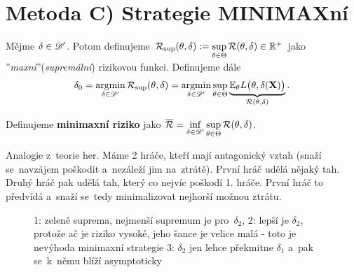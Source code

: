 \section{Metoda C) Strategie MINIMAXní}
\begin{define}
	Mějme $\delta\in\mathscr{D}'$. Potom definujeme $\mathcal{R}_{\sup}(\theta,\delta):=\sup\limits_{\theta\in\Theta} \mathcal{R}(\theta,\delta) \in\mathbb{R}^+$ jako ''\textit{maxní}''(\textit{supremální}) rizikovou funkci. Definujeme dále
	$$ \delta_0=\mathop{\mathrm{argmin}}\limits_{\delta\in\mathscr{D}'}\mathcal{R}_{\sup}(\theta,\delta)=\mathop{\mathrm{argmin}}\limits_{\delta\in\mathscr{D}' }\sup\limits_{\theta\in\Theta}\underbrace{\mathbb{E}_\theta L\big(\theta,\delta(\textbf{X})\big)}_{\mathcal{R}(\theta,\delta)}.$$
\end{define}

\begin{define}
	Definujeme \textbf{minimaxní riziko} jako $\overline{\mathcal{R}}=\inf\limits_{\delta\in\mathscr{D}'}\sup\limits_{\theta\in\Theta}\mathcal{R}(\theta,\delta)$.
\end{define}

\begin{remark}
	Analogie z~teorie her. Máme 2 hráče, kteří mají antagonický vztah (snaží se~navzájem poškodit a~nezáleží jim na~ztrátě). První hráč udělá nějaký tah. Druhý hráč pak udělá tah, který co nejvíc poškodí 1. hráče. První hráč to předvídá a~snaží se~tedy minimalizovat nejhorší možnou ztrátu.
\end{remark}

\begin{figure}[h]
	\centering
	\caption{1: zeleně suprema, nejmenší supremum je pro~$\delta_2$, 2: lepší je $\delta_2$, protože ač je riziko vysoké, jeho šance je velice malá - toto je nevýhoda minimaxní strategie 3: $\delta_2$ jen lehce překmitne $\delta_1$ a~pak se~k~němu blíží asymptoticky}
\end{figure}

